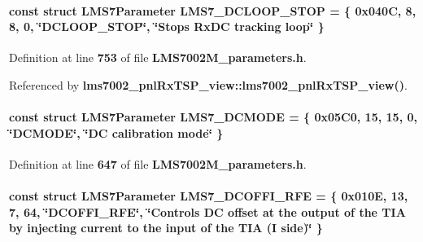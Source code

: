 \paragraph[{L\+M\+S7\+\_\+\+D\+C\+L\+O\+O\+P\+\_\+\+S\+T\+OP}]{\setlength{\rightskip}{0pt plus 5cm}const struct {\bf L\+M\+S7\+Parameter} L\+M\+S7\+\_\+\+D\+C\+L\+O\+O\+P\+\_\+\+S\+T\+OP = \{ 0x040\+C, 8, 8, 0, \char`\"{}\+D\+C\+L\+O\+O\+P\+\_\+\+S\+T\+O\+P\char`\"{}, \char`\"{}\+Stops Rx\+D\+C tracking loop\char`\"{} \}\hspace{0.3cm}{\ttfamily [static]}}\label{LMS7002M__parameters_8h_af90d10686704ffc47b1ba130f2be66f0}


Definition at line {\bf 753} of file {\bf L\+M\+S7002\+M\+\_\+parameters.\+h}.



Referenced by {\bf lms7002\+\_\+pnl\+Rx\+T\+S\+P\+\_\+view\+::lms7002\+\_\+pnl\+Rx\+T\+S\+P\+\_\+view()}.

\paragraph[{L\+M\+S7\+\_\+\+D\+C\+M\+O\+DE}]{\setlength{\rightskip}{0pt plus 5cm}const struct {\bf L\+M\+S7\+Parameter} L\+M\+S7\+\_\+\+D\+C\+M\+O\+DE = \{ 0x05\+C0, 15, 15, 0, \char`\"{}\+D\+C\+M\+O\+D\+E\char`\"{}, \char`\"{}\+D\+C calibration mode\char`\"{} \}\hspace{0.3cm}{\ttfamily [static]}}\label{LMS7002M__parameters_8h_a60437be42c3f9e5048a91eeed066d220}


Definition at line {\bf 647} of file {\bf L\+M\+S7002\+M\+\_\+parameters.\+h}.

\paragraph[{L\+M\+S7\+\_\+\+D\+C\+O\+F\+F\+I\+\_\+\+R\+FE}]{\setlength{\rightskip}{0pt plus 5cm}const struct {\bf L\+M\+S7\+Parameter} L\+M\+S7\+\_\+\+D\+C\+O\+F\+F\+I\+\_\+\+R\+FE = \{ 0x010\+E, 13, 7, 64, \char`\"{}\+D\+C\+O\+F\+F\+I\+\_\+\+R\+F\+E\char`\"{}, \char`\"{}\+Controls D\+C offset at the output of the T\+I\+A by injecting current to the input of the T\+I\+A (\+I side)\char`\"{} \}\hspace{0.3cm}{\ttfamily [static]}}\label{LMS7002M__parameters_8h_a0d567de859a1e2351262566d9c4cc1df}


